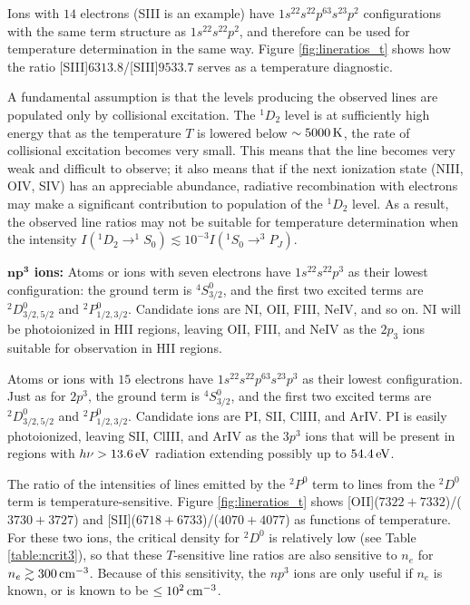 \documentclass[a4paper,10pt]{article}
\begin{document}
{\noindent}Ions with $14$ electrons (SIII is an example) have $1s^22s^22p^63s^23p^2$ configurations with the same term structure as $1s^22s^22p^2$, and therefore can be used for temperature determination in the same way. Figure \ref{fig:lineratios_t} shows how the ratio [SIII]$6313.8$/[SIII]$9533.7$ serves as a temperature diagnostic.

{\noindent}A fundamental assumption is that the levels producing the observed lines are populated only by collisional excitation. The $^1D_2$ level is at sufficiently high energy that as the temperature $T$ is lowered below $\sim5000\,{\rm K}$, the rate of collisional excitation becomes very small. This means that the line becomes very weak and difficult to observe; it also means that if the next ionization state (NIII, OIV, SIV) has an appreciable abundance, radiative recombination with electrons may make a significant contribution to population of the $^1D_2$ level. As a result, the observed line ratios may not be suitable for temperature determination when the intensity $I(^1D_2\rightarrow^1S_0)\lesssim 10^{-3} I(^1S_0\rightarrow^3P_J)$.

{\noindent}\textbf{$\mathbf{np^3}$ ions:} Atoms or ions with seven electrons have $1s^22s^22p^3$ as their lowest configuration: the ground term is $^4S_{3/2}^0$, and the first two excited terms are $^2D_{3/2,5/2}^0$ and $^2P_{1/2,3/2}^0$. Candidate ions are NI, OII, FIII, NeIV, and so on. NI will be photoionized in HII regions, leaving OII, FIII, and NeIV as the $2p_3$ ions suitable for observation in HII regions.

{\noindent}Atoms or ions with $15$ electrons have $1s^22s^22p^63s^23p^3$ as their lowest configuration. Just as for $2p^3$, the ground term is $^4S_{3/2}^0$, and the first two excited terms are $^2D_{3/2,5/2}^0$ and $^2P_{1/2,3/2}^0$. Candidate ions are PI, SII, ClIII, and ArIV. PI is easily photoionized, leaving SII, ClIII, and ArIV as the $3p^3$ ions that will be present in regions with $h\nu>13.6\,{\rm eV}$ radiation extending possibly up to $54.4\,{\rm eV}$.

{\noindent}The ratio of the intensities of lines emitted by the $^2P^0$ term to lines from the $^2D^0$ term is temperature-sensitive. Figure \ref{fig:lineratios_t} shows [OII]($7322+7332$)/($3730+3727$) and [SII]($6718+6733$)/($4070+4077$) as functions of temperature. For these two ions, the critical density for $^2D^0$ is relatively low (see Table \ref{table:ncrit3}), so that these $T$-sensitive line ratios are also sensitive to $n_e$ for $n_e\gtrsim300\,{\rm cm^{-3}}$. Because of this sensitivity, the $np^3$ ions are only useful if $n_e$ is known, or is known to be $\leq10^2\,{\rm cm^{-3}}$.
\end{document}
